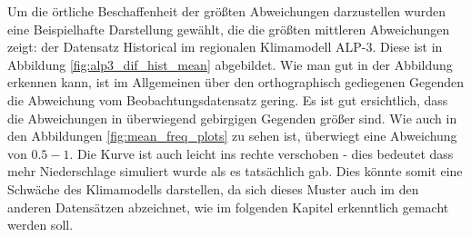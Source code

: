 Um die örtliche Beschaffenheit der größten Abweichungen darzustellen wurden eine Beispielhafte Darstellung gewählt, die die größten mittleren Abweichungen zeigt: der Datensatz Historical im regionalen Klimamodell ALP-3. Diese ist in Abbildung \ref{fig:alp3_dif_hist_mean} abgebildet.
Wie man gut in der Abbildung erkennen kann, ist im Allgemeinen über den orthographisch gediegenen Gegenden die Abweichung vom Beobachtungsdatensatz gering. Es ist gut ersichtlich, dass die Abweichungen in überwiegend gebirgigen Gegenden größer sind. Wie auch in den Abbildungen \ref{fig:mean_freq_plots} zu sehen ist, überwiegt eine Abweichung von $0.5-1$. Die Kurve ist auch leicht ins rechte verschoben - dies bedeutet dass mehr Niederschlage simuliert wurde als es tatsächlich gab. Dies könnte somit eine Schwäche des Klimamodells darstellen, da sich dieses Muster auch im den anderen Datensätzen abzeichnet, wie im folgenden Kapitel erkenntlich gemacht werden soll. \newpage

